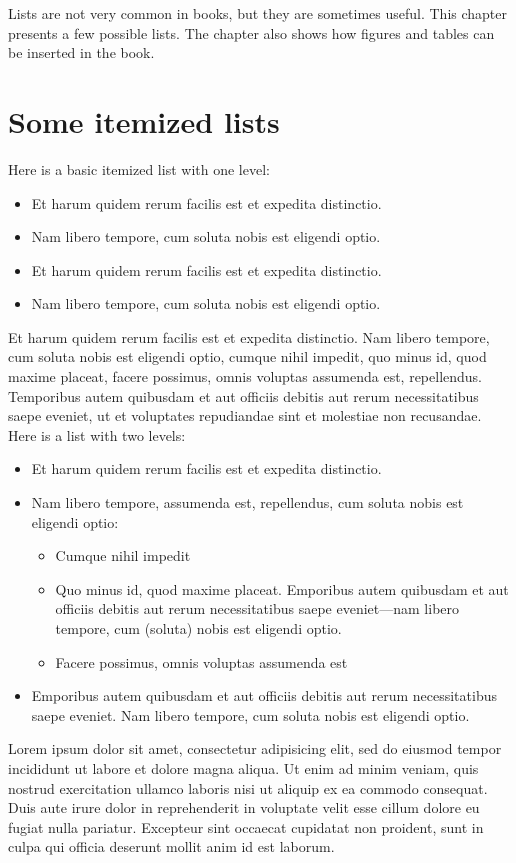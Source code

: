 Lists are not very common in books, but they are sometimes useful. This chapter presents a few possible lists. The chapter also shows how figures and tables can be inserted in the book.

\section{Some itemized lists}\label{s:lists}

Here is a basic itemized list with one level:
\begin{itemize}
\item Et harum quidem rerum facilis est et expedita distinctio.
\item Nam libero tempore, cum soluta nobis est eligendi optio.
\item Et harum quidem rerum facilis est et expedita distinctio.
\item Nam libero tempore, cum soluta nobis est eligendi optio.
\end{itemize}
Et harum quidem rerum facilis est et expedita distinctio. Nam libero tempore, cum soluta nobis est eligendi optio, cumque nihil impedit, quo minus id, quod maxime placeat, facere possimus, omnis voluptas assumenda est, repellendus. Temporibus autem quibusdam et aut officiis debitis aut rerum necessitatibus saepe eveniet, ut et voluptates repudiandae sint et molestiae non recusandae. Here is a list with two levels:

\begin{itemize}
\item Et harum quidem rerum facilis est et expedita distinctio.
\item Nam libero tempore, assumenda est, repellendus, cum soluta nobis est eligendi optio:
\begin{itemize}
\item Cumque nihil impedit
\item Quo minus id, quod maxime placeat. Emporibus autem quibusdam et aut officiis debitis aut rerum necessitatibus saepe eveniet---nam libero tempore, cum (soluta) nobis est eligendi optio.
\item Facere possimus, omnis voluptas assumenda est
\end{itemize}
\item Emporibus autem quibusdam et aut officiis debitis aut rerum necessitatibus saepe eveniet. Nam libero tempore, cum soluta nobis est eligendi optio.
\end{itemize}
Lorem ipsum dolor sit amet, consectetur adipisicing elit, sed do eiusmod tempor incididunt ut labore et dolore magna aliqua. Ut enim ad minim veniam, quis nostrud exercitation ullamco laboris nisi ut aliquip ex ea commodo consequat. Duis aute irure dolor in reprehenderit in voluptate velit esse cillum dolore eu fugiat nulla pariatur. Excepteur sint occaecat cupidatat non proident, sunt in culpa qui officia deserunt mollit anim id est laborum.

